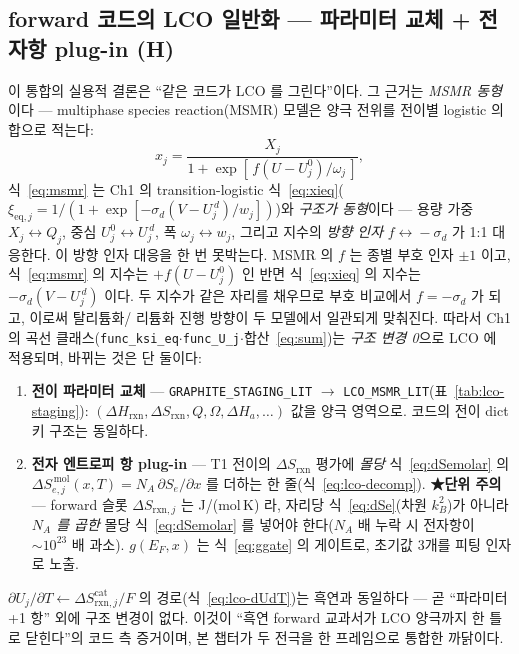 \documentclass[11pt,a4paper]{article}
\newcommand{\eq}{\mathrm{eq}}
\newcommand{\rxn}{\mathrm{rxn}}
\newcommand{\code}[1]{\texttt{#1}}
\begin{document}
\subsection{forward 코드의 LCO 일반화 — 파라미터 교체 + 전자항 plug-in (H)}\label{sec:lco-code}
이 통합의 실용적 결론은 ``같은 코드가 LCO 를 그린다''이다. 그 근거는 \emph{MSMR 동형}이다 — multiphase species
reaction(MSMR) 모델\cite{msmr2024}은 양극 전위를 전이별 logistic 의 합으로 적는다:
\begin{equation}
x_j=\frac{X_j}{1+\exp[\,f(U-U_j^0)/\omega_j\,]},
\label{eq:msmr}
\end{equation}
식~\eqref{eq:msmr} 는 Ch1 의 transition-logistic 식~\eqref{eq:xieq}($\xi_{\eq,j}=1/(1+\exp[-\sigma_d(V-U_j^{\,d})/w_j])$)와
\emph{구조가 동형}이다 — 용량 가중 $X_j\!\leftrightarrow\!Q_j$, 중심 $U_j^0\!\leftrightarrow\!U_j^{\,d}$, 폭 $\omega_j\!\leftrightarrow\!w_j$,
그리고 지수의 \emph{방향 인자} $f\!\leftrightarrow\!-\sigma_d$ 가 1:1 대응한다. 이 방향 인자 대응을 한 번 못박는다. MSMR 의
$f$ 는 종별 부호 인자 $\pm1$ 이고, 식~\eqref{eq:msmr} 의 지수는 $+f(U-U_j^0)$ 인 반면 식~\eqref{eq:xieq} 의 지수는
$-\sigma_d(V-U_j^{\,d})$ 이다. 두 지수가 같은 자리를 채우므로 부호 비교에서 $f=-\sigma_d$ 가 되고, 이로써 탈리튬화/
리튬화 진행 방향이 두 모델에서 일관되게 맞춰진다. 따라서 Ch1 의 곡선 클래스(\code{func\_ksi\_eq}$\cdot$\code{func\_U\_j}$\cdot$합산~\eqref{eq:sum})는
\emph{구조 변경 0}으로 LCO 에 적용되며, 바뀌는 것은 단 둘이다:
\begin{enumerate}[label=(\roman*),leftmargin=2.2em,itemsep=1pt]
\item \textbf{전이 파라미터 교체} — \code{GRAPHITE\_STAGING\_LIT} $\to$ \code{LCO\_MSMR\_LIT}(표~\ref{tab:lco-staging}):
$(\Delta H_\rxn,\Delta S_\rxn,Q,\Omega,\Delta H_a,\dots)$ 값을 양극 영역으로. 코드의 전이 dict 키 구조는 동일하다.
\item \textbf{전자 엔트로피 항 plug-in} — T1 전이의 $\Delta S_{\rxn}$ 평가에 \emph{몰당} 식~\eqref{eq:dSemolar} 의
$\Delta S_{e,j}^{\,\mathrm{mol}}(x,T)=N_A\,\partial S_e/\partial x$ 를 더하는 한 줄(식~\eqref{eq:lco-decomp}). \textbf{★단위 주의} —
forward 슬롯 $\Delta S_{\rxn,j}$ 는 J/(mol\,K) 라, 자리당 식~\eqref{eq:dSe}(차원 $k_B^2$)가 아니라 \emph{$N_A$ 를 곱한}
몰당 식~\eqref{eq:dSemolar} 를 넣어야 한다($N_A$ 배 누락 시 전자항이 $\sim10^{23}$ 배 과소). $g(E_F,x)$ 는
식~\eqref{eq:ggate} 의 게이트로, 초기값 3개를 피팅 인자로 노출.
\end{enumerate}
$\partial U_j/\partial T\leftarrow\Delta S_{\rxn,j}^\mathrm{cat}/F$ 의 경로(식~\eqref{eq:lco-dUdT})는 흑연과 동일하다 —
곧 ``파라미터 +1 항'' 외에 구조 변경이 없다. 이것이 ``흑연 forward 교과서가 LCO 양극까지 한 틀로 닫힌다''의 코드 측
증거이며, 본 챕터가 두 전극을 한 프레임으로 통합한 까닭이다.
\end{document}
